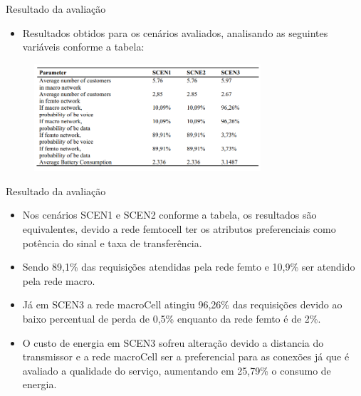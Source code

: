 \begin{frame}{Resultado da avaliação}
  \begin{itemize}
    \item Resultados obtidos para os cenários avaliados, analisando as seguintes variáveis conforme a tabela:
  \end{itemize}
  \begin{figure}
    \includegraphics [width=0.75\textwidth]{./Figures/val_3}
  \end{figure}
\end{frame}

\begin{frame}
  \begin{block}{Resultado da avaliação}
    \begin{itemize}
      \item \footnotesize Nos cenários SCEN1 e SCEN2 conforme a tabela, os resultados são equivalentes, devido a rede femtocell ter os atributos preferenciais como potência do sinal e taxa de transferência.
      \newline
      \item \footnotesize Sendo \alert{89,1\%} das requisições atendidas pela rede femto e \alert{10,9\%} ser atendido pela rede macro.
      \newline
      \item \footnotesize Já em SCEN3 a rede macroCell atingiu \alert{96,26\%} das requisições devido ao baixo percentual de perda de \alert{0,5\%} enquanto da rede femto é de \alert{2\%}.
      \newline
      \item \footnotesize O custo de energia em SCEN3 sofreu alteração devido a distancia do transmissor e a rede macroCell ser a preferencial para as conexões já que é avaliado a qualidade do serviço, aumentando em \alert{25,79\%} o consumo de energia.
    \end{itemize}
  \end{block}
\end{frame}
